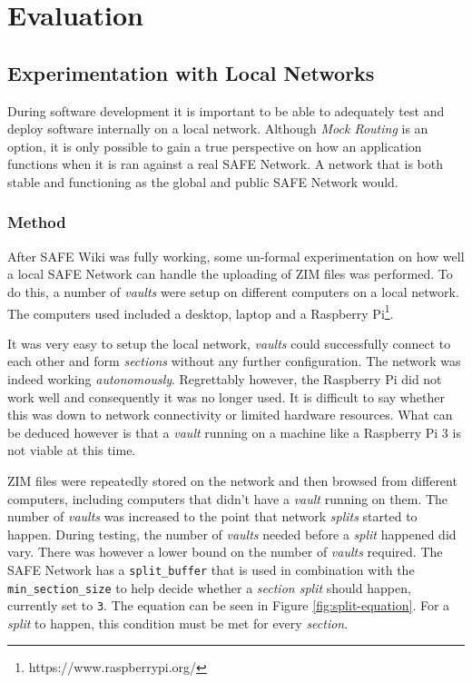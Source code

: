 \chapter{Evaluation}

\section{Experimentation with Local Networks}

During software development it is important to be able to adequately test and deploy software internally on a local network. Although \textit{Mock Routing} is an option, it is only possible to gain a true perspective on how an application functions when it is ran against a real SAFE Network. A network that is both stable and functioning as the global and public SAFE Network would.

\subsection{Method}

After SAFE Wiki was fully working, some un-formal experimentation on how well a local SAFE Network can handle the uploading of ZIM files was performed. To do this, a number of \textit{vaults} were setup on different computers on a local network. The computers used included a desktop, laptop and a Raspberry Pi\footnote{https://www.raspberrypi.org/}.

It was very easy to setup the local network, \textit{vaults} could successfully connect to each other and form \textit{sections} without any further configuration. The network was indeed working \textit{autonomously}. Regrettably however, the Raspberry Pi did not work well and consequently it was no longer used. It is difficult to say whether this was down to network connectivity or limited hardware resources. What can be deduced however is that a \textit{vault} running on a machine like a Raspberry Pi 3 is not viable at this time.

ZIM files were repeatedly stored on the network and then browsed from different computers, including computers that didn't have a \textit{vault} running on them. The number of \textit{vaults} was increased to the point that network \textit{splits} started to happen. During testing, the number of \textit{vaults} needed before a \textit{split} happened did vary. There was however a lower bound on the number of \textit{vaults} required. The SAFE Network has a \texttt{split\_buffer} that is used in combination with the \texttt{min\_section\_size} to help decide whether a \textit{section split} should happen, currently set to \texttt{3}. The equation can be seen in Figure \ref{fig:split-equation}. For a \textit{split} to happen, this condition must be met for every \textit{section}.

